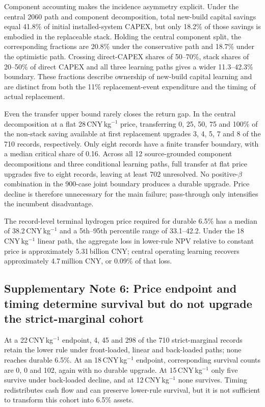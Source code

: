 \documentclass[11pt,a4paper]{article}
\begin{document}
Component accounting makes the incidence asymmetry explicit. Under the central 2060 path and component decomposition, total new-build capital savings equal 41.8\% of initial installed-system CAPEX, but only 18.2\% of those savings is embodied in the replaceable stack. Holding the central component split, the corresponding fractions are 20.8\% under the conservative path and 18.7\% under the optimistic path. Crossing direct-CAPEX shares of 50--70\%, stack shares of 20--50\% of direct CAPEX and all three learning paths gives a wider 11.3--42.3\% boundary. These fractions describe ownership of new-build capital learning and are distinct from both the 11\% replacement-event expenditure and the timing of actual replacement.

Even the transfer upper bound rarely closes the return gap. In the central decomposition at a flat 28\,CNY\,kg$^{-1}$ price, transferring 0, 25, 50, 75 and 100\% of the non-stack saving available at first replacement upgrades 3, 4, 5, 7 and 8 of the 710 records, respectively. Only eight records have a finite transfer boundary, with a median critical share of 0.16. Across all 12 source-grounded component decompositions and three conditional learning paths, full transfer at flat price upgrades five to eight records, leaving at least 702 unresolved. No positive-$\beta$ combination in the 900-case joint boundary produces a durable upgrade. Price decline is therefore unnecessary for the main failure; pass-through only intensifies the incumbent disadvantage.

The record-level terminal hydrogen price required for durable 6.5\% has a median of 38.2\,CNY\,kg$^{-1}$ and a 5th--95th percentile range of 33.1--42.2. Under the 18\,CNY\,kg$^{-1}$ linear path, the aggregate loss in lower-rule NPV relative to constant price is approximately 5.31\,billion CNY; central operating learning recovers approximately 4.7\,million CNY, or 0.09\% of that loss.

\subsection*{Supplementary Note 6: Price endpoint and timing determine survival but do not upgrade the strict-marginal cohort}

At a 22\,CNY\,kg$^{-1}$ endpoint, 4, 45 and 298 of the 710 strict-marginal records retain the lower rule under front-loaded, linear and back-loaded paths; none reaches durable 6.5\%. At an 18\,CNY\,kg$^{-1}$ endpoint, corresponding survival counts are 0, 0 and 102, again with no durable upgrade. At 15\,CNY\,kg$^{-1}$ only five survive under back-loaded decline, and at 12\,CNY\,kg$^{-1}$ none survives. Timing redistributes cash flow and can preserve lower-rule survival, but it is not sufficient to transform this cohort into 6.5\% assets.
\end{document}
